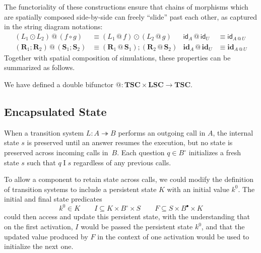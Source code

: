 \documentclass[acmsmall,screen,review,anonymous]{acmart}
\newcommand{\kw}[1]{\ensuremath{ \mathsf{#1} }}
\newcommand{\que}{\circ}
\newcommand{\ans}{\bullet}
\newcommand{\intl}[1]{#1^0}
\newcommand{\idsc}{\mathbf{id}} %
\begin{document}
The functoriality of these constructions ensure that
chains of morphisms which are spatially composed side-by-side
can freely ``slide'' past each other,
as captured in the string diagram notations:
\begin{align*}
  (L_1 \odot L_2) \mathbin@ (f \circ g) &\equiv
    (L_1 \mathbin@ f) \odot (L_2 \mathbin@ g)
  &
  \kw{id}_A \mathbin@ \kw{id}_U &\equiv \kw{id}_{A \mathbin@ U}
  \\
  (\mathbf{R}_1 \mathbin; \mathbf{R}_2) \mathbin@
  (\mathbf{S}_1 \mathbin; \mathbf{S}_2) &\equiv
  (\mathbf{R}_1 \mathbin@ \mathbf{S}_1) \mathbin;
  (\mathbf{R}_2 \mathbin@ \mathbf{S}_2)
  &
  \idsc_A \mathbin@ \idsc_U &\equiv \idsc_{A \mathbin@ U}
\end{align*}
Together with spatial composition of simulations,
these properties can be summarized as follows.

\begin{theorem} %
We have defined a double bifunctor
${\mathbin@} : \mathbf{TSC} \times \mathbf{LSC} \rightarrow \mathbf{TSC}$.
\end{theorem}


\subsection{Encapsulated State} \label{sec:encap} %

When a transition system $L : A \twoheadrightarrow B$
performs an outgoing call in $A$,
the internal state $s$ is preserved
until an answer resumes the execution,
but no state is preserved across incoming calls in~$B$.
Each question $q \in B^\que$ initializes a fresh state $s$
such that $q \mathrel{I} s$
regardless of any previous calls. %

To allow a component to retain state across calls,
we could modify the definition of transition systems
to include a persistent state $K$ with an initial value $\intl{k}$.
The initial and final state predicates
\begin{equation} \label{eqn:psts}
  \intl{k} \in K
  \qquad
  I \subseteq K \times B^\que \times S
  \qquad
  F \subseteq S \times B^\ans \times K
\end{equation}
could then access and update this persistent state,
with the understanding that on the first activation,
$I$ would be passed the persistent state $\intl{k}$,
and that the updated value produced by $F$
in the context of one activation
would be used to initialize the next one.
\end{document}
